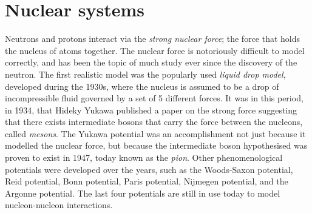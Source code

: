 \documentclass[10pt,twoside]{report}
\begin{document}
	\section{Nuclear systems}
	
	
	
	Neutrons and protons interact via the \emph{strong nuclear force}; the force that holds the nucleus of atoms together. The nuclear force is notoriously difficult to model correctly, and has been the topic of much study ever since the discovery of the neutron. The first realistic model was the popularly used \emph{liquid drop model}, developed during the 1930s, where the nucleus is assumed to be a drop of incompressible fluid governed by a set of 5 different forces. It was in this period, in 1934, that Hideky Yukawa  published a paper on the strong force suggesting that there exists intermediate bosons that carry the force between the nucleons, called \emph{mesons}. The Yukawa potential was an accomplishment not just because it modelled the nuclear force, but because the intermediate boson hypothesised was proven to exist in 1947, today known as the \emph{pion}. Other phenomenological potentials were developed over the years, such as \cite{MachleidtEntem11} the Woods-Saxon potential, Reid potential, Bonn potential, Paris potential, Nijmegen potential, and the Argonne potential. The last four potentials are still in use today to model nucleon-nucleon interactions.\\
	
\end{document}
